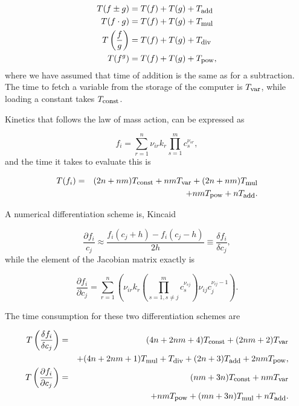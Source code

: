 \begin{eqnarray}
    T(f\pm g) &= T(f) + T(g) + T_{\mbox{{\footnotesize add}}} \\
    T(f\cdot g) &= T(f) + T(g) + T_{\mbox{{\footnotesize mul}}} \\
    T\left(\frac{f}{g}\right) &= T(f) + T(g) + T_{\mbox{{\footnotesize div}}} \\
    T(f^g) &= T(f) + T(g) + T_{\mbox{{\footnotesize pow}}},
\end{eqnarray}
where we have assumed that time of addition is the same as for a
subtraction. The time to fetch a variable from the storage of the
computer is $T_{\mbox{{\footnotesize var}}}$, while loading a constant takes
$T_{\mbox{{\footnotesize const}}}$.

Kinetics that follows the law of mass action, can be expressed as

\begin{equation}
  f_i = \sum_{r=1}^n \nu_{ir}k_r \prod_{s=1}^m c_s^{\nu_{sr}},
\end{equation}
and the time it takes to evaluate this is

\begin{eqnarray}
  T(f_i) &=& (2n+nm)T_{\mbox{{\footnotesize const}}} + nmT_{\mbox{{\footnotesize var}}} +
(2n+nm)T_{\mbox{{\footnotesize mul}}} \nonumber \\  
& & + nmT_{\mbox{{\footnotesize pow}}} + nT_{\mbox{{\footnotesize add}}}.
\end{eqnarray}

A numerical differentiation scheme is, Kincaid \etal \cite{NumAna:KC}

\begin{equation}
  \frac{\partial f_i}{c_j} \approx \frac{f_i(c_j+h) - f_i(c_j-h)}{2h}
\equiv \frac{\delta f_i}{\delta c_j},
\end{equation}
while the element of the Jacobian matrix exactly is

\begin{equation}
  \frac{\partial f_i}{\partial c_j} = \sum_{r=1}^n \left(\nu_{ir} k_r
  \left(\prod_{s=1,s\not=j}^m c_s^{\nu_{sj}}\right)
  \nu_{ij}c_j^{\nu_{ij}-1}\right). 
\end{equation}

The time consumption for these two differentiation schemes are

\begin{eqnarray}
  T\left(\frac{\delta f_i}{\delta c_j}\right) &=& (4n + 2nm +
  4)T_{\mbox{{\footnotesize const}}} + 
  (2nm + 2)T_{\mbox{{\footnotesize var}}} \nonumber \\ 
  & & + (4n+2nm+1)T_{\mbox{{\footnotesize mul}}} + T_{\mbox{{\footnotesize div}}}
  + (2n+3)T_{\mbox{{\footnotesize add}}} + 2nmT_{\mbox{{\footnotesize pow}}}, \\
  T\left(\frac{\partial f_i}{\partial c_j}\right) &=&
  (nm+3n)T_{\mbox{{\footnotesize const}}} + nmT_{\mbox{{\footnotesize var}}} \nonumber \\
  & & + nmT_{\mbox{{\footnotesize pow}}} + (mn+3n)T_{\mbox{{\footnotesize mul}}} + nT_{\mbox{{\footnotesize add}}}.
\end{eqnarray}

